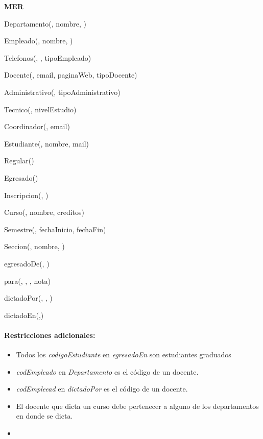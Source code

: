 \begin{multicols}{2}
	\noindent\textbf{MER}
	
	Departamento(, nombre, )
	
	Empleado(, nombre, )
	
	Telefonos(, , tipoEmpleado)
	
	Docente(, email, paginaWeb, tipoDocente)
	
	Administrativo(, tipoAdministrativo)
	
	Tecnico(, nivelEstudio)
	
	Coordinador(, email)
	
	Estudiante(, nombre, mail)
	
	Regular()
	
	Egresado()
	
	Inscripcion(, )
	
	Curso(, nombre, creditos)
	
	Semestre(, fechaInicio, fechaFin)
	
	Seccion(, nombre, )
	
	egresadoDe(, )
	
	para(, , , nota)
	
	dictadoPor(, , )
	
	dictadoEn(,)
	
	\paragraph{Restricciones adicionales:}
	\begin{itemize}
		\item Todos los \textit{codigoEstudiante} en \textit{egresadoEn} son estudiantes graduados
		\item \textit{codEmpleado} en \textit{Departamento} es el código de un docente.
		\item \textit{codEmpleead} en \textit{dictadoPor} es el código de un docente.
		\item El docente que dicta un curso debe pertenecer a alguno de los departamentos en donde se dicta.
		\item {}
	\end{itemize}
	

\end{multicols}
